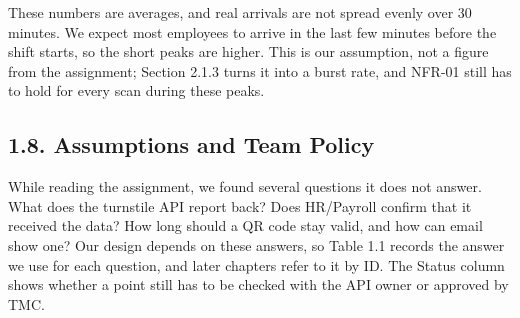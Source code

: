These numbers are averages, and real arrivals are not spread evenly over 30 minutes. We expect most employees to arrive in the last few minutes before the shift starts, so the short peaks are higher. This is our assumption, not a figure from the assignment; Section 2.1.3 turns it into a burst rate, and NFR-01 still has to hold for every scan during these peaks.

\subsection*{1.8. Assumptions and Team Policy}

{}

While reading the assignment, we found several questions it does not answer. What does the turnstile API report back? Does HR/Payroll confirm that it received the data? How long should a QR code stay valid, and how can email show one? Our design depends on these answers, so Table 1.1 records the answer we use for each question, and later chapters refer to it by ID. The Status column shows whether a point still has to be checked with the API owner or approved by TMC.

